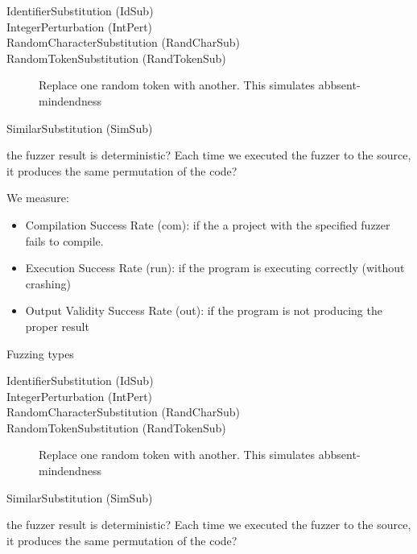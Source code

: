 \documentclass[10pt]{sigplanconf}
\begin{document}
\begin{description}
	\item [IdentifierSubstitution (IdSub)]
	\item [IntegerPerturbation (IntPert)]
	\item [RandomCharacterSubstitution (RandCharSub)]
	\item [RandomTokenSubstitution (RandTokenSub)] Replace one random token with another. This simulates abbsent-mindendness
	\item [SimilarSubstitution (SimSub)]
\end{description}

the fuzzer result is deterministic? Each time we executed the fuzzer to the source, it produces the same permutation of the code?

We measure:

\begin{itemize}
	\item Compilation Success Rate (com): if the a project with the specified fuzzer fails to compile.
	\item Execution Success Rate (run): if the program is executing correctly (without crashing)
	\item Output Validity Success Rate (out): if the program is not producing the proper result
\end{itemize}


Fuzzing types

\begin{description}
	\item [IdentifierSubstitution (IdSub)]
	\item [IntegerPerturbation (IntPert)]
	\item [RandomCharacterSubstitution (RandCharSub)]
	\item [RandomTokenSubstitution (RandTokenSub)] Replace one random token with another. This simulates abbsent-mindendness

	\item [SimilarSubstitution (SimSub)]
\end{description}

the fuzzer result is deterministic? Each time we executed the fuzzer to the source, it produces the same permutation of the code?
\end{document}
